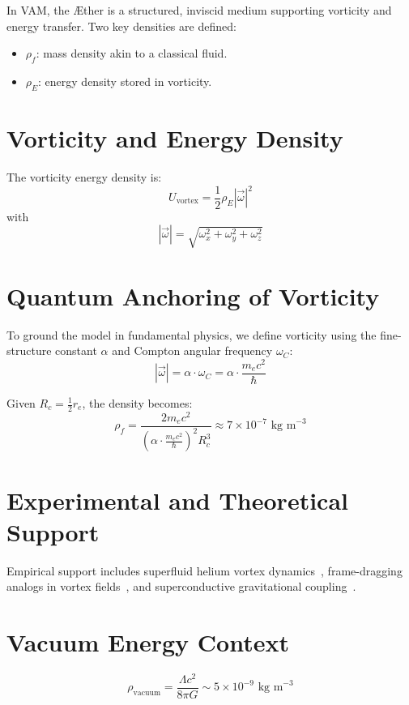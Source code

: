In VAM, the Æther is a structured, inviscid medium supporting vorticity and energy transfer. Two key densities are defined:
\begin{itemize}
    \item $\rho_{\scriptscriptstyle\boldsymbol\!f}$: mass density akin to a classical fluid.
    \item $\rho_{\scriptscriptstyle\boldsymbol\!E}$: energy density stored in vorticity.
\end{itemize}

\section{Vorticity and Energy Density}

The vorticity energy density is:
\[
U_{\text{vortex}} = \frac{1}{2} \rho_{\scriptscriptstyle\boldsymbol\!E} |\vec{\omega}|^2
\]
with
\[
|\vec{\omega}| = \sqrt{\omega_x^2 + \omega_y^2 + \omega_z^2}
\]

\section{Quantum Anchoring of Vorticity}

To ground the model in fundamental physics, we define vorticity using the fine-structure constant $\alpha$ and Compton angular frequency $\omega_C$:
\[
|\vec{\omega}| = \alpha \cdot \omega_C = \alpha \cdot \frac{m_e c^2}{\hbar}
\]

Given $R_c = \frac{1}{2} r_e$, the density becomes:
\[
\rho_{\scriptscriptstyle\boldsymbol\!f} = \frac{2 m_e c^2}{\left(\alpha \cdot \frac{m_e c^2}{\hbar}\right)^2 R_c^3} \approx 7 \times 10^{-7} \text{ kg m}^{-3}
\]

\section{Experimental and Theoretical Support}

Empirical support includes superfluid helium vortex dynamics~\cite{jackson2021}, frame-dragging analogs in vortex fields~\cite{paris2015}, and superconductive gravitational coupling~\cite{santiago2011}.

\section{Vacuum Energy Context}

\[
\rho_{\text{vacuum}} = \frac{\Lambda c^2}{8 \pi G} \sim 5 \times 10^{-9} \text{ kg m}^{-3}
\]

